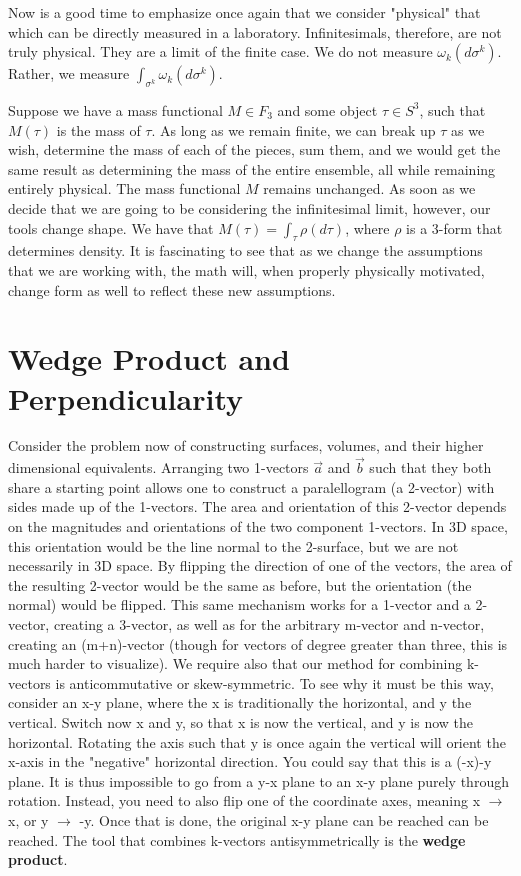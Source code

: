 \documentclass{book}
\begin{document}
Now is a good time to emphasize once again that we consider "physical" that which can be directly measured in a laboratory. Infinitesimals, therefore, are not truly physical. They are a limit of the finite case. We do not measure $\omega_k(d\sigma^k)$. Rather, we measure $\int_{\sigma^k}\omega_k(d\sigma^k)$. 


Suppose we have a mass functional $M \in F_3$ and some object $\tau \in S^3$, such that $M(\tau)$ is the mass of $\tau$.  As long as we remain finite, we can break up $\tau$ as we wish, determine the mass of each of the pieces, sum them, and we would get the same result as determining the mass of the entire ensemble, all while remaining entirely physical. The mass functional $M$ remains unchanged. As soon as we decide that we are going to be considering the infinitesimal limit, however, our tools change shape. We have that $M(\tau) = \int_\tau \rho(d\tau)$, where $\rho$ is a 3-form that determines density. It is fascinating to see that as we change the assumptions that we are working with, the math will, when properly physically motivated, change form as well to reflect these new assumptions. 



\section{Wedge Product and Perpendicularity}

Consider the problem now of constructing surfaces, volumes, and their higher dimensional equivalents. Arranging two 1-vectors $\vec{a}$ and $\vec{b}$ such that they both share a starting point allows one to construct a paralellogram (a 2-vector) with sides made up of the 1-vectors. The area and orientation of this 2-vector depends on the magnitudes and orientations of the two component 1-vectors. In 3D space, this orientation would be the line normal to the 2-surface, but we are not necessarily in 3D space. By flipping the direction of one of the vectors, the area of the resulting 2-vector would be the same as before, but the orientation (the normal) would be flipped. This same mechanism works for a 1-vector and a 2-vector, creating a 3-vector, as well as for the arbitrary m-vector and n-vector, creating an (m+n)-vector (though for vectors of degree greater than three, this is much harder to visualize). We require also that our method for combining k-vectors is anticommutative or skew-symmetric. To see why it must be this way, consider an x-y plane, where the x is traditionally the horizontal, and y the vertical. Switch now x and y, so that x is now the vertical, and y is now the horizontal. Rotating the axis such that y is once again the vertical will orient the x-axis in the "negative" horizontal direction. You could say that this is a (-x)-y plane. It is thus impossible to go from a y-x plane to an x-y plane purely through rotation. Instead, you need to also flip one of the coordinate axes, meaning x $\to$ x, or y $\to$ -y. Once that is done, the original x-y plane can be reached can be reached. The tool that combines k-vectors antisymmetrically is the \textbf{wedge product}.
\end{document}
